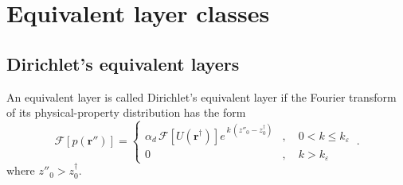 \section{Equivalent layer classes}
\label{sec:eqlayer_classes}

\subsection{Dirichlet's equivalent layers}

\begin{definition}
	An equivalent layer is called Dirichlet's equivalent layer if the Fourier transform of its physical-property distribution has 
	the form
	\begin{equation}
		\mathcal{F} [ p(\mathbf{r}'') ] =
		\begin{cases}
			\alpha_{d} \, \mathcal{F} [ U(\mathbf{r}^{\dagger}) ] 
			e^{\, k \, (z''_{0} - z^{\dagger}_{0})} & , 
			\quad 0 < k \le k_{\varepsilon} \\
			0 & , \quad k > k_{\varepsilon} 
		\end{cases} \: .
		\label{eq:p-Fourier-Dirichlet}
	\end{equation}
	where $z''_{0} > z^{\dagger}_{0}$.
	\label{def:eql-Dirichlet}
\end{definition}

